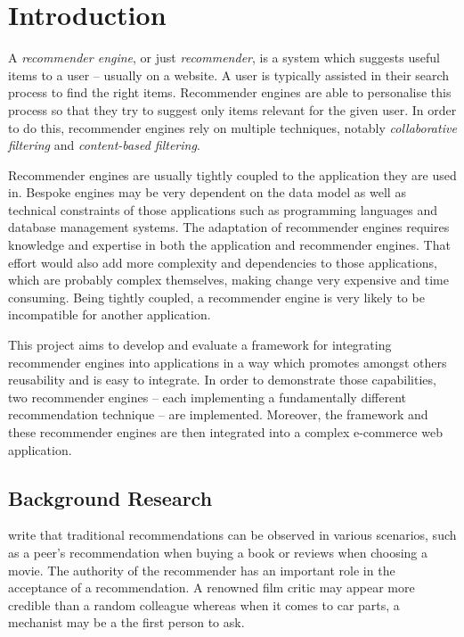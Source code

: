 \chapter{Introduction}

A \emph{recommender engine}, or just \emph{recommender}, is a system which suggests useful items to a user -- usually on a website. A user is typically assisted in their search process to find the right items. Recommender engines are able to personalise this process so that they try to suggest only items relevant for the given user. In order to do this, recommender engines rely on multiple techniques, notably \emph{collaborative filtering} and \emph{content-based filtering}.

Recommender engines are usually tightly coupled to the application they are used in. Bespoke  engines may be very dependent on the data model as well as technical constraints of those applications such as programming languages and database management systems. The adaptation of recommender engines requires knowledge and expertise in both the application and recommender engines. That effort would also add more complexity and dependencies to those applications, which are probably complex themselves, making change very expensive and time consuming. Being tightly coupled, a recommender engine is very likely to be incompatible for another application.

This project aims to develop and evaluate a framework for integrating recommender engines into applications in a way which promotes amongst others reusability and is easy to integrate. In order to demonstrate those capabilities, two recommender engines -- each implementing a fundamentally different recommendation technique -- are implemented. Moreover, the framework and these recommender engines are then integrated into a complex e-commerce web application.

\section{Background Research}

\citet{ricci11} write that traditional recommendations can be observed in various scenarios, such as a peer's recommendation when buying a book or reviews when choosing a movie. The authority of the recommender has an important role in the acceptance of a recommendation. A renowned film critic may appear more credible than a random colleague whereas when it comes to car parts, a mechanist may be a the first person to ask.

